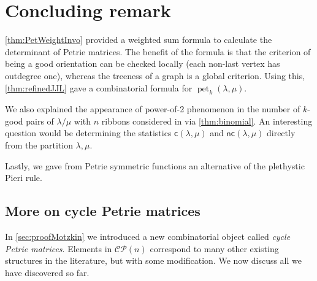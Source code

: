 \documentclass[pdflatex,sn-mathphys-num]{sn-jnl}%
\theoremstyle{thmstyleone}%
\theoremstyle{thmstyletwo}%
\theoremstyle{thmstylethree}%
\numberwithin{equation}{section}
\DeclareMathOperator{\pet}{pet}
\begin{document}
    \section{Concluding remark}\label{sec:Remark}
	\cref{thm:PetWeightInvo} provided a weighted sum formula to calculate the determinant of Petrie matrices. The benefit of the formula is that the criterion of being a good orientation can be checked locally (each non-last vertex has outdegree one), whereas the treeness of a graph is a global criterion. Using this,  \cref{thm:refinedJJL} gave a combinatorial formula for $\pet_k(\lambda,\mu)$.

        We also explained the appearance of power-of-2 phenomenon in the number of $k$-good pairs of $\lambda/\mu$ with $n$ ribbons considered in \cite{jin2024pierilikerulepetriesymmetric} via \cref{thm:binomial}. 
        An interesting question would be determining the statistics $\mathsf{c}(\lambda,\mu)$ and $\mathsf{nc}(\lambda,\mu)$ directly from the partition $\lambda,\mu$.

        Lastly, we gave from Petrie symmetric functions an alternative of the plethystic Pieri rule.
	

        \subsection{More on cycle Petrie matrices}\label{sec:detour}
        In \cref{sec:proofMotzkin} we introduced a new combinatorial object called \emph{cycle Petrie matrices}. Elements in $\mathcal{CP}(n)$ correspond to many other existing structures in the literature, but with some modification. We now discuss all we have discovered so far.
\end{document}
